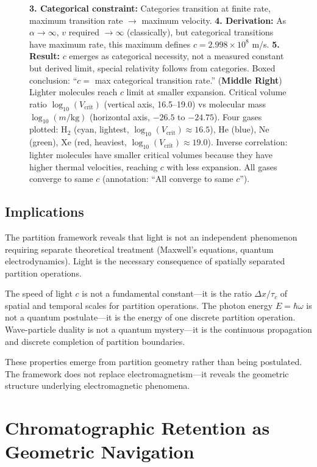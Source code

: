 \documentclass[twocolumn,superscriptaddress,prb,10pt]{revtex4-2}
\begin{document}
\begin{figure}[!htbp]
{\textbf{3. Categorical constraint:} Categories transition at finite rate, maximum transition rate $\to$ maximum velocity.
\textbf{4. Derivation:} As $\alpha \to \infty$, $v$ required $\to \infty$ (classically), but categorical transitions have maximum rate, this maximum defines $c = 2.998 \times 10^8$ m/s.
\textbf{5. Result:} $c$ emerges as categorical necessity, not a measured constant but derived limit, special relativity follows from categories. Boxed conclusion: ``$c =$ max categorical transition rate.''
(\textbf{Middle Right}) Lighter molecules reach $c$ limit at smaller expansion. Critical volume ratio $\log_{10}(V_{\text{crit}})$ (vertical axis, 16.5--19.0) vs molecular mass $\log_{10}(m/\text{kg})$ (horizontal axis, $-26.5$ to $-24.75$). Four gases plotted: H$_2$ (cyan, lightest, $\log_{10}(V_{\text{crit}}) \approx 16.5$), He (blue), Ne (green), Xe (red, heaviest, $\log_{10}(V_{\text{crit}}) \approx 19.0$). Inverse correlation: lighter molecules have smaller critical volumes because they have higher thermal velocities, reaching $c$ with less expansion. All gases converge to same $c$ (annotation: ``All converge to same $c$'').}
\label{fig:sldi}
\end{figure}

\subsection{Implications}

The partition framework reveals that light is not an independent phenomenon requiring separate theoretical treatment (Maxwell's equations, quantum electrodynamics). Light is the necessary consequence of spatially separated partition operations.

The speed of light $c$ is not a fundamental constant—it is the ratio $\Delta x / \tau_c$ of spatial and temporal scales for partition operations. The photon energy $E = \hbar\omega$ is not a quantum postulate—it is the energy of one discrete partition operation. Wave-particle duality is not a quantum mystery—it is the continuous propagation and discrete completion of partition boundaries.

These properties emerge from partition geometry rather than being postulated. The framework does not replace electromagnetism—it reveals the geometric structure underlying electromagnetic phenomena.

\section{Chromatographic Retention as Geometric Navigation}
\label{sec:chromatography}
\end{document}
